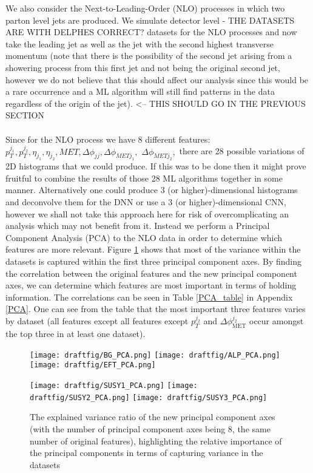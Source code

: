 \documentclass[aps,onecolumn,showpacs,superscriptaddress,groupedaddress,nofootinbib,preprint]{revtex4-1}
\begin{document}
We also consider the Next-to-Leading-Order (NLO) processes in which two parton level jets are produced. We simulate detector level - THE DATASETS ARE WITH DELPHES CORRECT? datasets for the NLO processes and now take the leading jet as well as the jet with the second highest transverse momentum (note that there is the possibility of the second jet arising from a showering process from this first jet and not being the original second jet, however we do not believe that this should affect our analysis since this would be a rare occurrence and a ML algorithm will still find patterns in the data regardless of the origin of the jet). <-- THIS SHOULD GO IN THE PREVIOUS SECTION 
\\
\\
Since for the NLO process we have 8 different features: $ p_T^{j_1}, p_T^{j_2}, \eta_{j_1}, \eta_{j_2}, MET, \Delta \phi_{jj}, \Delta \phi_{MET j_1},$ $\Delta \phi_{MET j_2}, $ there are 28 possible variations of 2D histograms that we could produce. If this was to be done then it might prove fruitful to combine the results of those 28 ML algorithms together in some manner. Alternatively one could produce 3 (or higher)-dimensional histograms and deconvolve them for the DNN or use a 3 (or higher)-dimensional CNN, however we shall not take this approach here for risk of overcomplicating an analysis which may not benefit from it. Instead we perform a Principal Component Analysis (PCA) to the NLO data in order to determine which features are more relevant. Figure \ref{PCA_plots} shows that most of the variance within the datasets is captured within the first three principal component axes. By finding the correlation between the original features and the new principal component axes, we can determine which features are most important in terms of holding information. The correlations can be seen in Table \ref{PCA_table} in Appendix \ref{PCA}. One can see from the table that the most important three features varies by dataset (all features except all features except $p_T^{j_2}$ and $\Delta \phi_{\text{MET}}^{j_2}$ occur amongst the top three in at least one dataset).
\begin{figure}%
\centering
\texttt{[image: draftfig/BG\_PCA.png]}
\texttt{[image: draftfig/ALP\_PCA.png]}
\texttt{[image: draftfig/EFT\_PCA.png]}

\texttt{[image: draftfig/SUSY1\_PCA.png]}
\texttt{[image: draftfig/SUSY2\_PCA.png]}
\texttt{[image: draftfig/SUSY3\_PCA.png]}
\caption{The explained variance ratio of the new principal component axes (with the number of principal component axes being 8, the same number of original features), highlighting the relative importance of the principal components in terms of capturing variance in the datasets}\label{PCA_plots}
\end{figure}
\end{document}
